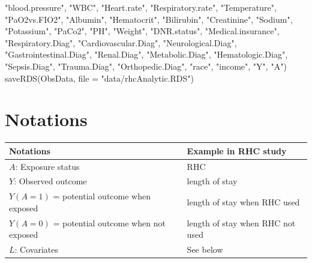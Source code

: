 \documentclass[
]{book}
\newenvironment{Shaded}{\begin{snugshade}}{\end{snugshade}}
\newcommand{\AttributeTok}[1]{\textcolor[rgb]{0.77,0.63,0.00}{#1}}
\newcommand{\FunctionTok}[1]{\textcolor[rgb]{0.00,0.00,0.00}{#1}}
\newcommand{\NormalTok}[1]{#1}
\newcommand{\StringTok}[1]{\textcolor[rgb]{0.31,0.60,0.02}{#1}}
\begin{document}
\begin{Shaded}
\begin{Highlighting}[]
                    \StringTok{"blood.pressure"}\NormalTok{, }\StringTok{"WBC"}\NormalTok{, }\StringTok{"Heart.rate"}\NormalTok{, }\StringTok{"Respiratory.rate"}\NormalTok{, }
                    \StringTok{"Temperature"}\NormalTok{, }\StringTok{"PaO2vs.FIO2"}\NormalTok{, }\StringTok{"Albumin"}\NormalTok{, }\StringTok{"Hematocrit"}\NormalTok{, }
                    \StringTok{"Bilirubin"}\NormalTok{, }\StringTok{"Creatinine"}\NormalTok{, }\StringTok{"Sodium"}\NormalTok{, }\StringTok{"Potassium"}\NormalTok{, }\StringTok{"PaCo2"}\NormalTok{, }
                    \StringTok{"PH"}\NormalTok{, }\StringTok{"Weight"}\NormalTok{, }\StringTok{"DNR.status"}\NormalTok{, }\StringTok{"Medical.insurance"}\NormalTok{, }
                    \StringTok{"Respiratory.Diag"}\NormalTok{, }\StringTok{"Cardiovascular.Diag"}\NormalTok{, }
                    \StringTok{"Neurological.Diag"}\NormalTok{, }\StringTok{"Gastrointestinal.Diag"}\NormalTok{, }\StringTok{"Renal.Diag"}\NormalTok{,}
                    \StringTok{"Metabolic.Diag"}\NormalTok{, }\StringTok{"Hematologic.Diag"}\NormalTok{, }\StringTok{"Sepsis.Diag"}\NormalTok{, }
                    \StringTok{"Trauma.Diag"}\NormalTok{, }\StringTok{"Orthopedic.Diag"}\NormalTok{, }\StringTok{"race"}\NormalTok{, }\StringTok{"income"}\NormalTok{, }
                    \StringTok{"Y"}\NormalTok{, }\StringTok{"A"}\NormalTok{)}
\FunctionTok{saveRDS}\NormalTok{(ObsData, }\AttributeTok{file =} \StringTok{"data/rhcAnalytic.RDS"}\NormalTok{)}
\end{Highlighting}
\end{Shaded}

\hypertarget{notations}{%
\section{Notations}\label{notations}}

\begin{longtable}[]{@{}
  >{\raggedright\arraybackslash}p{}
  >{\raggedright\arraybackslash}p{}@{}}
\toprule
Notations & Example in RHC study \\
\midrule
\endhead
\(A\): Exposure status & RHC \\
\(Y\): Observed outcome & length of stay \\
\(Y(A=1)\) = potential outcome when exposed & length of stay when RHC used \\
\(Y(A=0)\) = potential outcome when not exposed & length of stay when RHC not used \\
\(L\): Covariates & See below \\
\bottomrule
\end{longtable}
\end{document}
